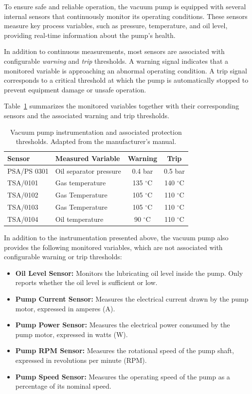 To ensure safe and reliable operation, the vacuum pump is equipped with several internal sensors that continuously monitor its operating conditions. 
These sensors measure key process variables, such as pressure, temperature, and oil level, providing real-time information about the pump's health.

In addition to continuous measurements, most sensors are associated with configurable \emph{warning} and \emph{trip} thresholds. A warning signal indicates that a 
monitored variable is approaching an abnormal operating condition. A trip signal corresponds to a critical threshold at which the pump is automatically stopped to 
prevent equipment damage or unsafe operation.

Table~\ref{tab:instrumentation} summarizes the monitored variables together with their corresponding sensors and the associated warning and trip thresholds.

\begin{table}[htbp]
\centering
\caption{Vacuum pump instrumentation and associated protection thresholds. Adapted from the manufacturer's manual.}
\label{tab:instrumentation}

\begin{tabular}{l l c c}
\hline
\textbf{Sensor} & \textbf{Measured Variable} & \textbf{Warning} & \textbf{Trip} \\
\hline
PSA/PS 0301  & Oil separator pressure    & 0.4 bar       & 0.5 bar \\
TSA/0101     & Gas temperature           & 135 $^\circ$C & 140 $^\circ$C \\
TSA/0102     & Gas Temperature           & 105 $^\circ$C & 110 $^\circ$C \\
TSA/0103     & Gas Temperature           & 105 $^\circ$C & 110 $^\circ$C \\
TSA/0104     & Oil temperature           & 90 $^\circ$C  & 110 $^\circ$C \\
\hline
\end{tabular}
\end{table}

In addition to the instrumentation presented above, the vacuum pump also provides the following monitored variables, which are not associated with configurable warning or trip thresholds:

\begin{itemize}
    \item \textbf{Oil Level Sensor:} Monitors the lubricating oil level inside the pump. Only reports whether the oil level is sufficient or low.
    \item \textbf{Pump Current Sensor:} Measures the electrical current drawn by the pump motor, expressed in amperes (A).
    \item \textbf{Pump Power Sensor:} Measures the electrical power consumed by the pump motor, expressed in watts (W).
    \item \textbf{Pump RPM Sensor:} Measures the rotational speed of the pump shaft, expressed in revolutions per minute (RPM).
    \item \textbf{Pump Speed Sensor:} Measures the operating speed of the pump as a percentage of its nominal speed.
\end{itemize}


